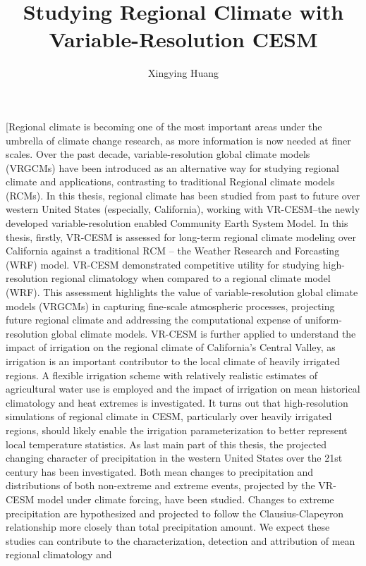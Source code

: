 \documentclass[12pt]{ucdavisthesis}
\title          {Studying Regional Climate with Variable-Resolution CESM}
\author         {Xingying Huang}
\begin{document}
\newcommand{\bibfont}{\singlespacing}


%

\makeintropages %


%
%
%





\UMIabstract[Regional climate is becoming one of the most important areas under the umbrella of climate change research, as more information is now needed at finer scales. Over the past decade, variable-resolution global climate models (VRGCMs) have been introduced as an alternative way for studying regional climate and applications, contrasting to traditional Regional climate models (RCMs). In this thesis, regional climate has been studied from past to future over western United States (especially, California), working with VR-CESM--the newly developed variable-resolution enabled Community Earth System Model. In this thesis, firstly, VR-CESM is assessed for long-term regional climate modeling over California against a traditional RCM -- the Weather Research and Forcasting (WRF) model. VR-CESM demonstrated competitive utility for studying high-resolution regional climatology when compared to a regional climate model (WRF). This assessment highlights the value of variable-resolution global climate models (VRGCMs) in capturing fine-scale atmospheric processes, projecting future regional climate and addressing the computational expense of uniform-resolution global climate models. VR-CESM is further applied to understand the impact of irrigation on the regional climate of California's Central Valley, as irrigation is an important contributor to the local climate of heavily irrigated regions. A flexible irrigation scheme with relatively realistic estimates of agricultural water use is employed and the impact of irrigation on mean historical climatology and heat extremes is investigated. It turns out that high-resolution simulations of regional climate in CESM, particularly over heavily irrigated regions, should likely enable the irrigation parameterization to better represent local temperature statistics. As last main part of this thesis, the projected changing character of precipitation in the western United States over the 21st century has been investigated. Both mean changes to precipitation and distributions of both non-extreme and extreme events, projected by the VR-CESM model under climate forcing, have been studied. Changes to extreme precipitation are hypothesized and projected to follow the Clausius-Clapeyron relationship more closely than total precipitation amount. We expect these studies can contribute to the characterization, detection and attribution of mean regional climatology and 
\end{document}
